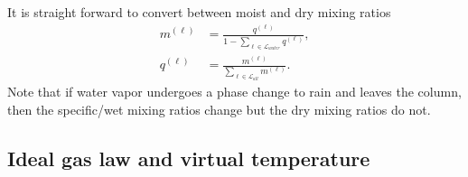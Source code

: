 \documentclass{agujournal}
\begin{document}
{It is straight forward to convert between moist and dry mixing ratios
\begin{align}
m^{(\ell)}&=\frac{q^{(\ell)}}{1-\sum_{\ell \in \mathcal{L}_{water}} q^{(\ell)}},\label{eq:mxqx}\\
q^{(\ell)}&=\frac{m^{(\ell)}}{\sum_{\ell \in \mathcal{L}_{all}} m^{(\ell)}}.
\end{align}
Note that if water vapor undergoes a phase change to rain and leaves the column, then the specific/wet mixing ratios change but the dry mixing ratios do not.
%
\subsection{Ideal gas law and virtual temperature}\label{sec:tv}

}
\end{document}

